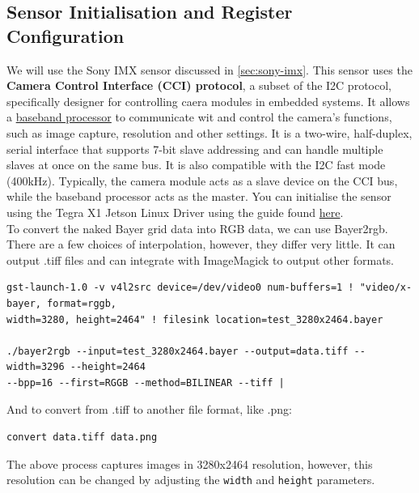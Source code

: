 \subsection{Sensor Initialisation and Register Configuration}
We will use the Sony IMX sensor discussed in \ref{sec:sony-imx}.
\nl
This sensor uses the \textbf{Camera Control Interface (CCI) protocol}, a subset of the I2C protocol, specifically designer for controlling caera modules in embedded systems. It allows a \href{https://en.wikipedia.org/wiki/Baseband_processor}{baseband processor} to communicate wit and control the camera's functions, such as image capture, resolution and other settings.
It is a two-wire, half-duplex, serial interface that supports 7-bit slave addressing and can handle multiple slaves at once on the same bus. It is also compatible with the I2C fast mode (400kHz).
Typically, the camera module acts as a slave device on the CCI bus, while the baseband processor acts as the master.
\nl
You can initialise the sensor using the Tegra X1 Jetson Linux Driver using the guide found \href{https://developer.ridgerun.com/wiki/index.php/Sony_IMX219_Linux_driver}{here}.
\\
To convert the naked Bayer grid data into RGB data, we can use Bayer2rgb. There are a few choices of interpolation, however, they differ very little. It can output .tiff files and can integrate with ImageMagick to output other formats.
\begin{verbatim}
gst-launch-1.0 -v v4l2src device=/dev/video0 num-buffers=1 ! "video/x-bayer, format=rggb,
width=3280, height=2464" ! filesink location=test_3280x2464.bayer

./bayer2rgb --input=test_3280x2464.bayer --output=data.tiff --width=3296 --height=2464
--bpp=16 --first=RGGB --method=BILINEAR --tiff |
\end{verbatim}
And to convert from .tiff to another file format, like .png:
\begin{verbatim}
convert data.tiff data.png
\end{verbatim}
The above process captures images in 3280x2464 resolution, however, this resolution can be changed by adjusting the \verb|width| and \verb|height| parameters.


